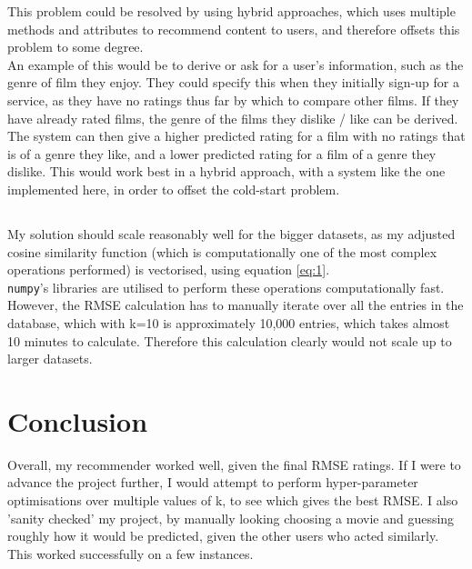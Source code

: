 \documentclass{scrartcl}
\begin{document}
This problem could be resolved by using hybrid approaches, which uses multiple methods and attributes to recommend content to users, and therefore offsets this problem to some degree. \\

An example of this would be to derive or ask for a user's information, such as the genre of film they enjoy. They could specify this when they initially sign-up for a service, as they have no ratings thus far by which to compare other films. If they have already rated films, the genre of the films they dislike / like can be derived. The system can then give a higher predicted rating for a film with no ratings that is of a genre they like, and a lower predicted rating for a film of a genre they dislike. This would work best in a hybrid approach, with a system like the one implemented here, in order to offset the cold-start problem.

\subsection{}

My solution should scale reasonably well for the bigger datasets, as my adjusted cosine similarity function (which is computationally one of the most complex operations performed) is vectorised, using equation \ref{eq:1}.\\

\texttt{numpy}'s libraries are utilised to perform these operations computationally fast. \\

However, the RMSE calculation has to manually iterate over all the entries in the database, which with k=10 is approximately 10,000 entries, which takes almost 10 minutes to calculate. Therefore this calculation clearly would not scale up to larger datasets.

\newpage
\section{Conclusion}

Overall, my recommender worked well, given the final RMSE ratings. If I were to advance the project further, I would attempt to perform hyper-parameter optimisations over multiple values of k, to see which gives the best RMSE. I also 'sanity checked' my project, by manually looking choosing a movie and guessing roughly how it would be predicted, given the other users who acted similarly. This worked successfully on a few instances.\\
\end{document}
